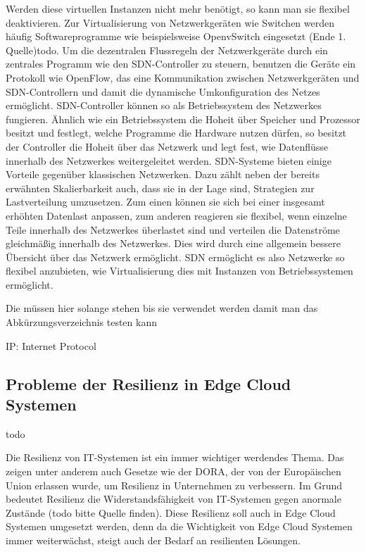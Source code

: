 Werden diese virtuellen Instanzen nicht mehr benötigt, so kann man sie flexibel deaktivieren. Zur Virtualisierung von Netzwerkgeräten wie Switchen werden häufig Softwareprogramme wie beispielsweise OpenvSwitch eingesetzt (Ende 1. Quelle)todo. 
Um die dezentralen Flussregeln der Netzwerkgeräte durch ein zentrales Programm wie den \ac{SDN}-Controller zu steuern, benutzen die Geräte ein Protokoll wie OpenFlow, 
das eine Kommunikation zwischen Netzwerkgeräten und \ac{SDN}-Controllern und damit die dynamische Umkonfiguration des Netzes ermöglicht. \ac{SDN}-Controller können so als Betriebssystem des Netzwerkes fungieren. 
Ähnlich wie ein Betriebssystem die Hoheit über Speicher und Prozessor besitzt und festlegt, welche Programme die Hardware nutzen dürfen, so besitzt der Controller die Hoheit über das Netzwerk und legt fest, 
wie Datenflüsse innerhalb des Netzwerkes weitergeleitet werden. \ac{SDN}-Systeme bieten einige Vorteile gegenüber klassischen Netzwerken. Dazu zählt neben der bereits erwähnten Skalierbarkeit auch, 
dass sie in der Lage sind, Strategien zur Lastverteilung umzusetzen. Zum einen können sie sich bei einer insgesamt erhöhten Datenlast anpassen, zum anderen reagieren sie flexibel, 
wenn einzelne Teile innerhalb des Netzwerkes überlastet sind und verteilen die Datenströme gleichmäßig innerhalb des Netzwerkes. Dies wird durch eine allgemein bessere Übersicht über das Netzwerk ermöglicht. 
\ac{SDN} ermöglicht es also Netzwerke so flexibel anzubieten, wie Virtualisierung dies mit Instanzen von Betriebssystemen ermöglicht.





Die müssen hier solange stehen bis sie verwendet werden damit man das Abkürzungsverzeichnis testen kann


\ac{IP}: Internet Protocol





\subsection{Probleme der Resilienz in Edge Cloud Systemen}

todo

Die Resilienz von \ac{IT}-Systemen ist ein immer wichtiger werdendes Thema. Das zeigen unter anderem auch Gesetze wie der \ac{DORA}, der von der Europäischen Union erlassen wurde, 
um Resilienz in Unternehmen zu verbessern. Im Grund bedeutet Resilienz die Widerstandsfähigkeit von \ac{IT}-Systemen gegen anormale Zustände (todo bitte Quelle finden). 
Diese Resilienz soll auch in Edge Cloud Systemen umgesetzt werden, denn da die Wichtigkeit von Edge Cloud Systemen immer weiterwächst, steigt auch der Bedarf an resilienten Lösungen. 

